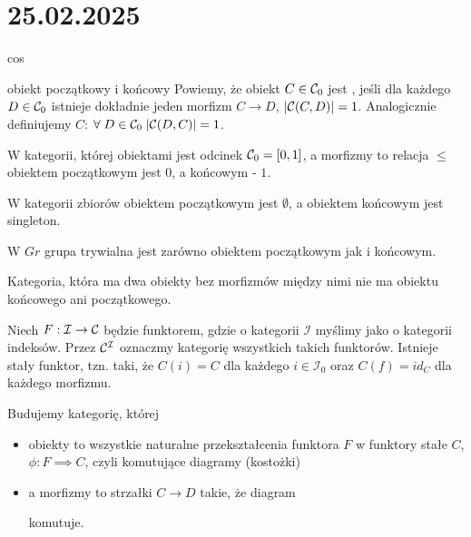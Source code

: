 \section{25.02.2025}{cos}

\begin{definition}{obiekt początkowy i końcowy}{}
  Powiemy, że obiekt $C\in \mathcal{C}_0$ jest , jeśli dla każdego $D\in\mathcal{C}_0$ istnieje dokładnie jeden morfizm $C\to D$, $|\mathcal{C}(C, D)|=1$. Analogicznie definiujemy  $C$: $\forall\;D\in\mathcal{C}_0\;|\mathcal{C}(D, C)|=1$.
\end{definition}

\begin{example}[m]
  \item W kategorii, której obiektami jest odcinek $\mathcal{C}_0=[0,1]$, a morfizmy to relacja $\leq$ obiektem początkowym jest $0$, a końcowym - $1$.
  \item W kategorii zbiorów obiektem początkowym jest $\emptyset$, a obiektem końcowym jest singleton.
  \item W $Gr$ grupa trywialna jest zarówno obiektem początkowym jak i końcowym.
  \item Kategoria, która ma dwa obiekty bez morfizmów między nimi nie ma obiektu końcowego ani początkowego.
\end{example}

Niech $F:\mathcal{I}\to \mathcal{C}$ będzie funktorem, gdzie o kategorii $\mathcal{I}$ myślimy jako o kategorii indeksów. Przez $\mathcal{C}^{\mathcal{I}}$ oznaczmy kategorię wszystkich takich funktorów. 
Istnieje stały funktor, tzn. taki, że $C(i)=C$ dla każdego $i\in\mathcal{I}_0$ oraz $C(f)=id_C$ dla każdego morfizmu.

Budujemy kategorię, której 
\begin{itemize}
  \item obiekty to wszystkie naturalne przekształcenia funktora $F$ w funktory stałe $C$, $\phi:F\implies C$, czyli komutujące diagramy (kostożki) 
    \begin{center}
    \end{center}
  \item a morfizmy to strzałki $C\to D$ takie, że diagram
    \begin{center}
    \end{center}
    komutuje.
\end{itemize}

